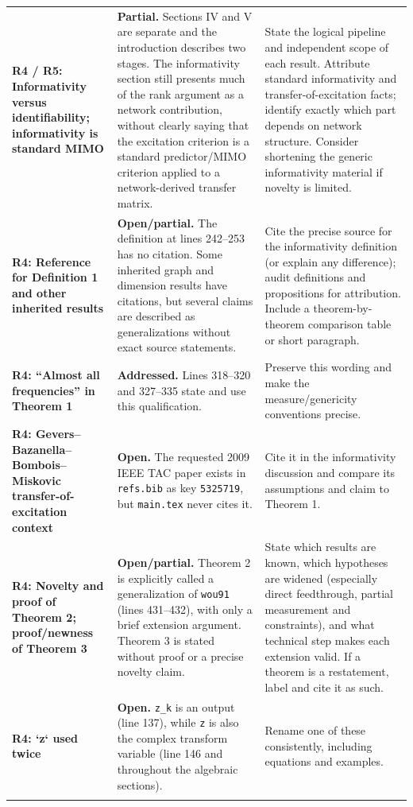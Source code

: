 \documentclass[11pt,a4paper]{article}
\begin{document}
\begin{longtable}{@{}p{}p{}p{}@{}}
\textbf{R4 / R5: Informativity versus identifiability; informativity is standard MIMO} & \textbf{Partial.} Sections IV and V are separate and the introduction describes two stages. The informativity section still presents much of the rank argument as a network contribution, without clearly saying that the excitation criterion is a standard predictor/MIMO criterion applied to a network-derived transfer matrix. & State the logical pipeline and independent scope of each result. Attribute standard informativity and transfer-of-excitation facts; identify exactly which part depends on network structure. Consider shortening the generic informativity material if novelty is limited.\\\addlinespace\midrule
\textbf{R4: Reference for Definition 1 and other inherited results} & \textbf{Open/partial.} The definition at lines 242–253 has no citation. Some inherited graph and dimension results have citations, but several claims are described as generalizations without exact source statements. & Cite the precise source for the informativity definition (or explain any difference); audit definitions and propositions for attribution. Include a theorem-by-theorem comparison table or short paragraph.\\\addlinespace\midrule
\textbf{R4: “Almost all frequencies” in Theorem 1} & \textbf{Addressed.} Lines 318–320 and 327–335 state and use this qualification. & Preserve this wording and make the measure/genericity conventions precise.\\\addlinespace\midrule
\textbf{R4: Gevers–Bazanella–Bombois–Miskovic transfer-of-excitation context} & \textbf{Open.} The requested 2009 IEEE TAC paper exists in \texttt{refs.bib} as key \texttt{5325719}, but \texttt{main.tex} never cites it. & Cite it in the informativity discussion and compare its assumptions and claim to Theorem 1.\\\addlinespace\midrule
\textbf{R4: Novelty and proof of Theorem 2; proof/newness of Theorem 3} & \textbf{Open/partial.} Theorem 2 is explicitly called a generalization of \texttt{wou91} (lines 431–432), with only a brief extension argument. Theorem 3 is stated without proof or a precise novelty claim. & State which results are known, which hypotheses are widened (especially direct feedthrough, partial measurement and constraints), and what technical step makes each extension valid. If a theorem is a restatement, label and cite it as such.\\\addlinespace\midrule
\textbf{R4: `z` used twice} & \textbf{Open.} \texttt{z\_k} is an output (line 137), while \texttt{z} is also the complex transform variable (line 146 and throughout the algebraic sections). & Rename one of these consistently, including equations and examples.\\\addlinespace\midrule

\end{longtable}
\end{document}
